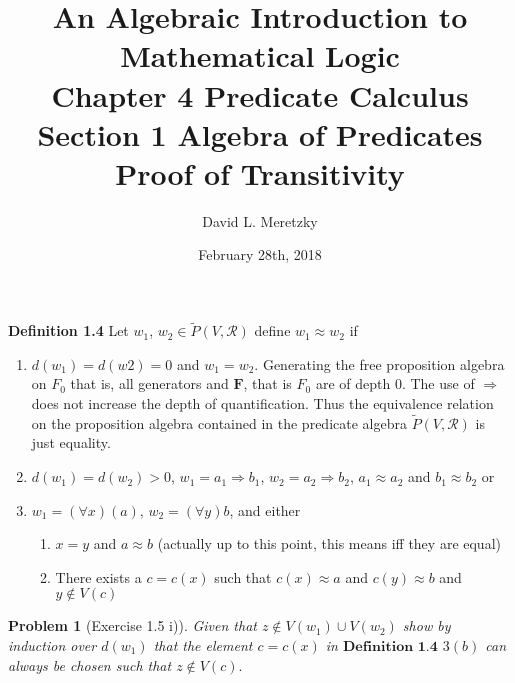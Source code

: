 \documentclass{article}
\title{ \vspace{-10ex} %
An Algebraic Introduction to Mathematical Logic\\
Chapter 4 Predicate Calculus \\
Section 1 Algebra of Predicates \\
Proof of Transitivity 
}
\author{David L. Meretzky
}
\date{%
February 28th, 2018
}
\theoremstyle{problemstyle}
\newtheorem{problem}{Problem}
\theoremstyle{lemmastyle}
\theoremstyle{theoremstyle}
\begin{document}
\maketitle

\begin{flushleft}
\textbf{Definition 1.4} Let $w_1$, $w_2 \in \widetilde{P}(V,\mathscr{R})$ define $w_1 \approx w_2$ if

\begin{enumerate}
\item $d(w_1) = d(w2) = 0$ and $w_1 = w_2$. Generating the free proposition algebra on $F_0$ that is, all generators and $\textbf{F}$, that is $F_0$ are of depth 0. The use of $\Rightarrow$ does not increase the depth of quantification. Thus the equivalence relation on the proposition algebra contained in the predicate algebra $\widetilde{P}(V,\mathscr{R})$ is just equality. 
\item $d(w_1) = d(w_2) > 0$, $w_1 = a_1 \Rightarrow b_1$, $w_2 = a_2 \Rightarrow b_2$, $a_1 \approx a_2$ and $b_1 \approx b_2$ or 
\item $w_1 = (\forall x)(a)$, $w_2 = (\forall y)b$, and either
\begin{enumerate}
\item $x = y$ and $a \approx b$   (actually up to this point, this means iff they are equal)
\item There exists a $c = c(x)$ such that $c(x) \approx a$ and $c(y) \approx b$ and $y \notin V(c)$ 
\end{enumerate}
\end{enumerate}
\end{flushleft}


\begin{problem}[Exercise 1.5 i)]
Given that $z \notin V(w_1) \cup V(w_2)$ show by induction over $d(w_1)$ that the element $c = c(x)$ in $\textbf{Definition 1.4}$ $3 (b)$ can always be chosen such that $z \notin V(c).$
\end{problem}
\end{document}
